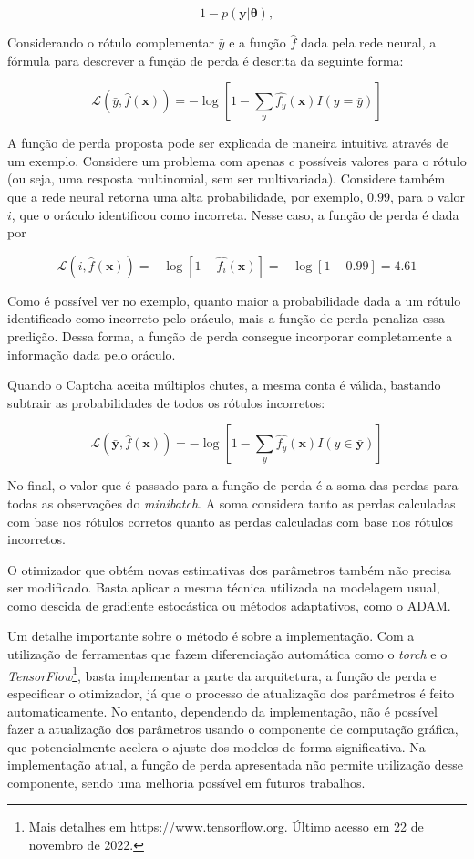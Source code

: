\documentclass[12pt,twoside,brazilian]{book}
\begin{document}
\[
1 - p(\mathbf y|\boldsymbol \theta),
\]

Considerando o rótulo complementar \(\bar y\) e a função \(\hat f\) dada
pela rede neural, a fórmula para descrever a função de perda é descrita
da seguinte forma:

\[
\mathcal L(\bar y, \hat f(\mathbf x)) = -\log\left[1 - \sum_{y}\hat {f_y}(\mathbf x) I(y=\bar y)\right]
\]

A função de perda proposta pode ser explicada de maneira intuitiva
através de um exemplo. Considere um problema com apenas \(c\) possíveis
valores para o rótulo (ou seja, uma resposta multinomial, sem ser
multivariada). Considere também que a rede neural retorna uma alta
probabilidade, por exemplo, \(0.99\), para o valor \(i\), que o oráculo
identificou como incorreta. Nesse caso, a função de perda é dada por

\[
\mathcal L(i,\hat f(\mathbf x)) = -\log\left[1-\hat {f_i}(\mathbf x)\right] = -\log\left[1-0.99 \right] = 4.61
\]

Como é possível ver no exemplo, quanto maior a probabilidade dada a um
rótulo identificado como incorreto pelo oráculo, mais a função de perda
penaliza essa predição. Dessa forma, a função de perda consegue
incorporar completamente a informação dada pelo oráculo.

Quando o Captcha aceita múltiplos chutes, a mesma conta é válida,
bastando subtrair as probabilidades de todos os rótulos incorretos:

\[
\mathcal L(\bar {\mathbf y}, \hat f(\mathbf x)) = -\log\left[1 - \sum_{y}\hat {f_y}(\mathbf x) I(y \in \bar {\mathbf y})\right]
\]

No final, o valor que é passado para a função de perda é a soma das
perdas para todas as observações do \emph{minibatch}. A soma considera
tanto as perdas calculadas com base nos rótulos corretos quanto as
perdas calculadas com base nos rótulos incorretos.

O otimizador que obtém novas estimativas dos parâmetros também não
precisa ser modificado. Basta aplicar a mesma técnica utilizada na
modelagem usual, como descida de gradiente estocástica ou métodos
adaptativos, como o ADAM.

Um detalhe importante sobre o método é sobre a implementação. Com a
utilização de ferramentas que fazem diferenciação automática como o
\emph{torch} e o \emph{TensorFlow}\footnote{Mais detalhes em
  \url{https://www.tensorflow.org}. Último acesso em 22 de novembro de
  2022.}, basta implementar a parte da arquitetura, a função de perda e
especificar o otimizador, já que o processo de atualização dos
parâmetros é feito automaticamente. No entanto, dependendo da
implementação, não é possível fazer a atualização dos parâmetros usando
o componente de computação gráfica, que potencialmente acelera o ajuste
dos modelos de forma significativa. Na implementação atual, a função de
perda apresentada não permite utilização desse componente, sendo uma
melhoria possível em futuros trabalhos.
\end{document}

